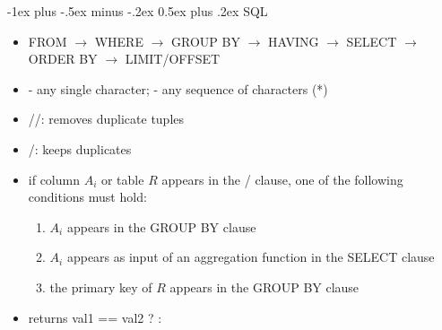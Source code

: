 \documentclass[10pt, landscape]{article}
\makeatletter
\renewcommand{\section}{\@startsection{section}{1}{0mm}%
  {-1ex plus -.5ex minus -.2ex}%
  {0.5ex plus .2ex}%
{\normalfont\large\bfseries}}
\makeatother
\begin{document}
\begin{multicols}{4}
  \section{SQL}
  \begin{itemize}
    \item FROM $\rightarrow$ WHERE $\rightarrow$ GROUP BY $\rightarrow$ HAVING $\rightarrow$ SELECT $\rightarrow$ ORDER BY $\rightarrow$ LIMIT/OFFSET
    \item \code{\_} - any single character; \code{\%} - any sequence of characters (*)
    \item {}//: removes duplicate tuples
    \item {}/: keeps duplicates
    \item if column $A_i$ or table $R$ appears in the / clause, one of the following conditions must hold:
      \begin{enumerate}
        \item $A_i$ appears in the GROUP BY clause
        \item $A_i$ appears as input of an aggregation function in the SELECT clause
        \item the primary key of $R$ appears in the GROUP BY clause
      \end{enumerate}
    \item \textbf{} returns val1 == val2 ?  : 
  \end{itemize}


\end{multicols}
\end{document}
